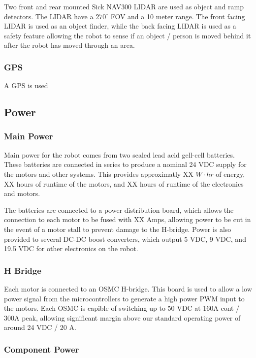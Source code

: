 Two front and rear mounted Sick NAV300 LIDAR are used as object and ramp detectors. The LIDAR have a $270^{\circ}$ FOV and a 10 meter range. The front facing LIDAR is used as an object finder, while the back facing LIDAR is used as a safety feature allowing the robot to sense if an object / person is moved behind it after the robot has moved through an area.

\subsubsection{GPS}

A GPS is used

\subsection{Power}

\subsubsection{Main Power}

Main power for the robot comes from two sealed lead acid gell-cell batteries. These batteries are connected in series to produce a nominal 24 VDC supply for the motors and other systems. This provides approximatly XX $W \cdot hr$ of energy, XX hours of runtime of the motors, and XX hours of runtime of the electronics and motors.

The batteries are connected to a power distribution board, which allows the connection to each motor to be fused with XX Amps, allowing power to be cut in the event of a motor stall to prevent damage to the H-bridge. Power is also provided to several DC-DC boost converters, which output 5 VDC, 9 VDC, and 19.5 VDC for other electronics on the robot.

\subsubsection{H Bridge}

Each motor is connected to an OSMC H-bridge. This board is used to allow a low power signal from the microcontrollers to generate a high power PWM input to the motors. Each OSMC is capible of switching up to 50 VDC at 160A cont / 300A peak, allowing significant margin above our standard operating power of around 24 VDC / 20 A.

\subsubsection{Component Power}

